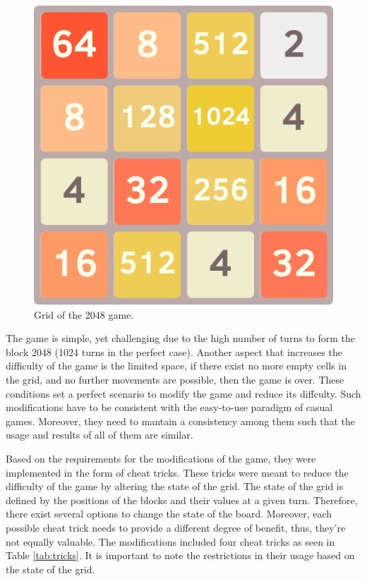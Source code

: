 \begin{figure}[htb]
    \vskip 5mm
        \begin{center}
            \includegraphics[scale=0.5]{./Figures/game_grid.png}
            \caption{Grid of the 2048 game.}
            \label{fig:2048-grid}
        \end{center}
    \vskip -5mm
\end{figure}

The game is simple, yet challenging due to the high number of turns to form the block 2048 (1024 turns in the perfect case). Another aspect that increases the difficulty of the game is the limited space, if there exist no more empty cells in the grid, and no further movements are possible, then the game is over. These conditions set a perfect scenario to modify the game and reduce its diffculty. Such modifications have to be consistent with the easy-to-use paradigm of casual games. Moreover, they need to mantain a consistency among them such that the usage and results of all of them are similar.

Based on the requirements for the modifications of the game, they were implemented in the form of cheat tricks. These tricks were meant to reduce the difficulty of the game by altering the state of the grid. The state of the grid is defined by the positions of the blocks and their values at a given turn. Therefore, there exist several options to change the state of the board. Moreover, each possible cheat trick needs to provide a different degree of benefit, thus, they're not equally valuable. The modifications included four cheat tricks as seen in Table \ref{tab:tricks}. It is important to note the restrictions in their usage based on the state of the grid.

